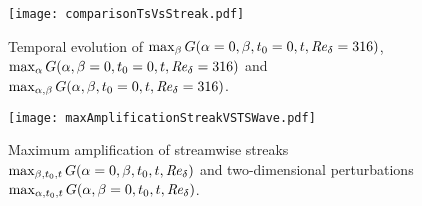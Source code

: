 \documentclass{jfm}
\newcommand\Rey{\mbox{\textit{Re}}}  %
\newcommand\sumer{{\rm Sumer}}
\begin{document}
\begin{comment}
  \begin{sidewaysfigure}
  \centering
  \begin{subfigure}[b]{0.5\textwidth}
    \texttt{[image: nonModalContour2Re10000.pdf]}
    \caption{ $\Rey_\sumer = 141 $, $ t_{\max} = 1.5 $ }
    \label{fig:contourA}
  \end{subfigure} \nolinebreak
  \begin{subfigure}[b]{0.5\textwidth}
    \texttt{[image: nonModalContour2Re50000.pdf]}
    \caption{ $\Rey_\sumer = 316 $, $ t_{\max} = 8.2 $ }
    \label{fig:contourB}
  \end{subfigure}
  \begin{subfigure}[b]{0.5\textwidth}
    \texttt{[image: nonModalContour2Re100000.pdf]}
    \caption{ $\Rey_\sumer = 447 $, $ t_{\max} = 9.9 $ }
    \label{fig:contourC}
  \end{subfigure} \nolinebreak
  \begin{subfigure}[b]{0.5\textwidth}
    \texttt{[image: nonModalContour2Re500000.pdf]}
    \caption{ $\Rey_\sumer = 1000 $, $ t_{\max} = 16.5 $ }
    \label{fig:contourD}
  \end{subfigure}
  \caption{Contour plots of the amplification 
    $ G(\alpha,\beta,t_0 = 0,t_{\max} , \Rey_\delta )$ at $ t_{\max} = 1.5, 8.2 , 9.9 , 16.5 $
    for the cases $ \Rey_\delta = 141, 316, 447 , 1000 $, respectively. The plots to the left and below the contour plot show a slice along the $ \beta $- and
$ \alpha $-axes, respectively.}
  \label{fig:amplificationAtmax}
\end{sidewaysfigure}
\end{comment}
\begin{figure}
  \centering
    \texttt{[image: comparisonTsVsStreak.pdf]}
    \caption{ Temporal evolution
of $ \max_\beta G(\alpha=0,\beta,t_0 = 0 , t , \Rey_\delta = 316) $,
 $ \max_\alpha G(\alpha,\beta=0,t_0 = 0 , t , \Rey_\delta = 316) $
and  $ \max_{\alpha,\beta} G(\alpha,\beta,t_0 = 0 , t , \Rey_\delta = 316) $. }
    \label{fig:temporalEvolutionStreakVSTS}
\end{figure}


\begin{figure}
  \centering
    \texttt{[image: maxAmplificationStreakVSTSWave.pdf]}
    \caption{Maximum amplification of streamwise streaks $ \max_{\beta,t_0,t} G(\alpha=0,\beta,t_0,t,\Rey_\delta) $ and two-dimensional perturbations 
$ \max_{\alpha,t_0,t} G(\alpha,\beta=0,t_0,t,\Rey_\delta) $.}
    \label{fig:maxAmplificationStreaksVSTS}
\end{figure}
\end{document}
